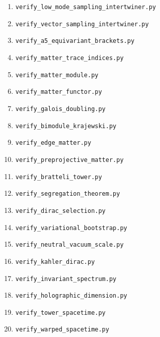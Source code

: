 \documentclass[12pt,a4paper]{article}
\theoremstyle{definition}
\begin{document}
\begin{enumerate}
\item \texttt{verify\_low\_mode\_sampling\_intertwiner.py}
\item \texttt{verify\_vector\_sampling\_intertwiner.py}
\item \texttt{verify\_a5\_equivariant\_brackets.py}
\item \texttt{verify\_matter\_trace\_indices.py}
\item \texttt{verify\_matter\_module.py}
\item \texttt{verify\_matter\_functor.py}
\item \texttt{verify\_galois\_doubling.py}
\item \texttt{verify\_bimodule\_krajewski.py}
\item \texttt{verify\_edge\_matter.py}
\item \texttt{verify\_preprojective\_matter.py}
\item \texttt{verify\_bratteli\_tower.py}
\item \texttt{verify\_segregation\_theorem.py}
\item \texttt{verify\_dirac\_selection.py}
\item \texttt{verify\_variational\_bootstrap.py}
\item \texttt{verify\_neutral\_vacuum\_scale.py}
\item \texttt{verify\_kahler\_dirac.py}
\item \texttt{verify\_invariant\_spectrum.py}
\item \texttt{verify\_holographic\_dimension.py}
\item \texttt{verify\_tower\_spacetime.py}
\item \texttt{verify\_warped\_spacetime.py}
\end{enumerate}
\end{document}

